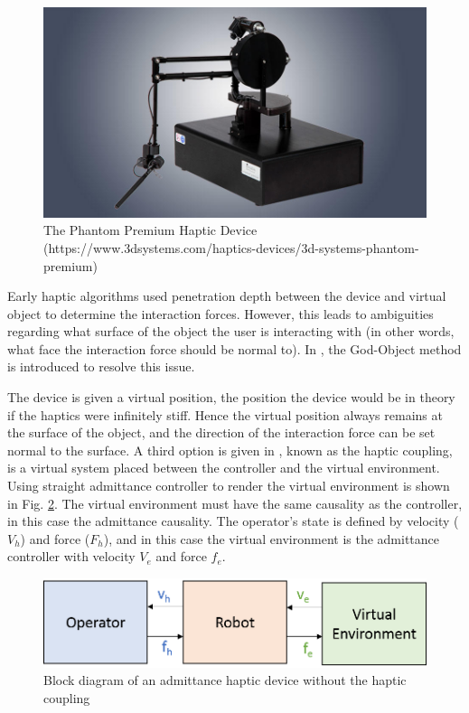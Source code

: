 \documentclass[12pt]{report}
\begin{document}
	
	\begin{figure}[t] 
		\centering
		\includegraphics[width=0.6\linewidth]{phantom}
		\caption{The Phantom Premium Haptic Device (https://www.3dsystems.com/haptics-devices/3d-systems-phantom-premium)}
		\label{fig:phantom}
	\end{figure}		
	
	
		
	
		Early haptic algorithms used penetration depth between the device and virtual object to determine the interaction forces. However, this leads to ambiguities regarding what surface of the object the user is interacting with (in other words, what face the interaction force should be normal to). In \cite{Zilles}, the God-Object method is introduced to resolve this issue. 
		
		The device is given a virtual position, the position the device would be in theory if the haptics were infinitely stiff. Hence the virtual position always remains at the surface of the object, and the direction of the interaction force can be set normal to the surface. A third option is given in \cite{Adams1999}, known as the haptic coupling, is a virtual system placed between the controller and the virtual environment. Using straight admittance controller to render the virtual environment is shown in Fig. \ref{fig:haptic_adm}. The virtual environment must have the same causality as the controller, in this case the admittance causality. The operator's state is defined by velocity ($V_h$) and force ($F_h$), and in this case the virtual environment is the admittance controller with velocity $V_e$ and force $f_e$. 
	
	\begin{figure}[h] 
		\centering
		\includegraphics[width=0.75\linewidth]{haptics_admittance}
		\caption{Block diagram of an admittance haptic device without the haptic coupling}
		\label{fig:haptic_adm}
	\end{figure}	
	
\end{document}
